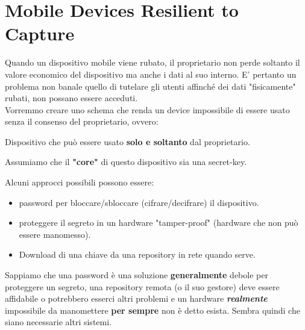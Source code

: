 \chapter{Mobile Devices Resilient to Capture}
Quando un dispositivo mobile viene rubato, il proprietario non perde soltanto il valore economico del dispositivo ma anche i dati al suo interno. E' pertanto un problema non banale quello di tutelare gli utenti affinché dei dati "fisicamente" rubati, non possano essere acceduti.\\
Vorremmo creare uno schema che renda un device impossibile di essere usato senza il consenso del proprietario, ovvero:
\begin{definition}\label{def:resdev}
Dispositivo che può essere usato \textbf{solo e soltanto} dal proprietario.
\end{definition}
\begin{remark}
Assumiamo che il \textbf{"core"} di questo dispositivo sia una secret-key.
\end{remark}
Alcuni approcci possibili possono essere:
\begin{itemize}
    \item password per bloccare/sbloccare (cifrare/decifrare) il dispositivo.
    \item proteggere il segreto in un hardware "tamper-proof" (hardware che non può essere manomesso).
    \item Download di una chiave da una repository in rete quando serve. 
\end{itemize}
Sappiamo che una password è una soluzione \textbf{generalmente} debole per proteggere un segreto, una repository remota (o il suo gestore) deve essere affidabile o potrebbero esserci altri problemi e un hardware \textbf{\textit{realmente}} impossibile da manomettere \textbf{per sempre} non è detto esista. Sembra quindi che siano necessarie altri sistemi.

